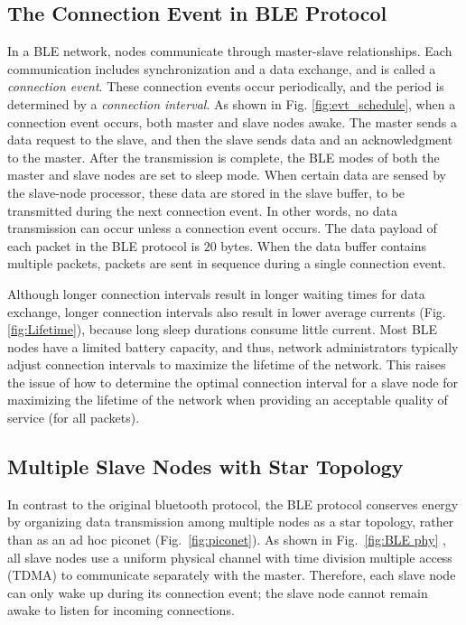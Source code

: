 \documentclass[10pt,journal,compsoc]{IEEEtran}
\begin{document}
\subsection{The Connection Event in BLE Protocol}
In a BLE network, nodes communicate through master-slave relationships. Each communication includes synchronization and a data exchange, and is called a {\it connection event}. These connection events occur periodically, and the period is determined by a {\it connection interval}. As shown in Fig. \ref{fig:evt_schedule}, when a connection event occurs, both master and slave nodes awake. The master sends a data request to the slave, and then the slave sends data and an acknowledgment to the master. After the transmission is complete, the BLE modes of both the master and slave nodes are set to sleep mode. When certain data are sensed by the slave-node processor, these data are stored in the slave buffer, to be transmitted during the next connection event.
In other words, no data transmission can occur unless a connection event occurs. The data payload of each packet in the BLE protocol is $20$ bytes. When the data buffer contains multiple packets, packets are sent in sequence during a single connection event.

Although longer connection intervals result in longer waiting times for data exchange, longer connection intervals also result in lower average currents (Fig. \ref{fig:Lifetime}), because long sleep durations consume little current. Most BLE nodes have a limited battery capacity, and thus, network administrators typically adjust connection intervals to maximize the lifetime of the network. This raises the issue of how to determine the optimal connection interval for a slave node for maximizing the lifetime of the network when providing an acceptable quality of service (for all packets).



\subsection{Multiple Slave Nodes with Star Topology}
In contrast to the original bluetooth protocol, the BLE protocol conserves energy by organizing data transmission among multiple nodes as a star topology, rather than as an ad hoc piconet (Fig.~\ref{fig:piconet}). As shown in Fig.~\ref{fig:BLE phy} \cite{cho2015performance}, all slave nodes use a uniform physical channel with time division multiple access (TDMA) to communicate separately with the master. Therefore, each slave node can only wake up during its connection event; the slave node cannot remain awake to listen for incoming connections.
\end{document}
